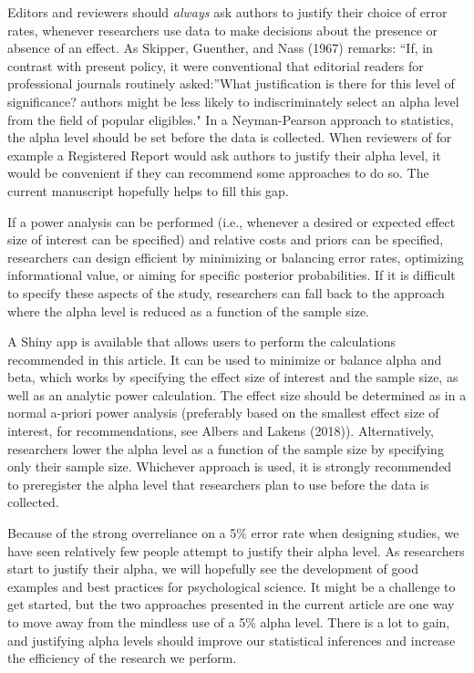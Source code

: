 \documentclass[
  english,
  ,jou, a4paper,floatsintext]{apa6}
\begin{document}
Editors and reviewers should \emph{always} ask authors to justify their choice of error rates, whenever researchers use data to make decisions about the presence or absence of an effect. As Skipper, Guenther, and Nass (1967) remarks: ``If, in contrast with present policy, it were conventional that editorial readers for professional journals routinely asked:''What justification is there for this level of significance? authors might be less likely to indiscriminately select an alpha level from the field of popular eligibles." In a Neyman-Pearson approach to statistics, the alpha level should be set before the data is collected. When reviewers of for example a Registered Report would ask authors to justify their alpha level, it would be convenient if they can recommend some approaches to do so. The current manuscript hopefully helps to fill this gap.

If a power analysis can be performed (i.e., whenever a desired or expected effect size of interest can be specified) and relative costs and priors can be specified, researchers can design efficient by minimizing or balancing error rates, optimizing informational value, or aiming for specific posterior probabilities. If it is difficult to specify these aspects of the study, researchers can fall back to the approach where the alpha level is reduced as a function of the sample size.

A Shiny app is available that allows users to perform the calculations recommended in this article. It can be used to minimize or balance alpha and beta, which works by specifying the effect size of interest and the sample size, as well as an analytic power calculation. The effect size should be determined as in a normal a-priori power analysis (preferably based on the smallest effect size of interest, for recommendations, see Albers and Lakens (2018)). Alternatively, researchers lower the alpha level as a function of the sample size by specifying only their sample size. Whichever approach is used, it is strongly recommended to preregister the alpha level that researchers plan to use before the data is collected.

Because of the strong overreliance on a 5\% error rate when designing studies, we have seen relatively few people attempt to justify their alpha level. As researchers start to justify their alpha, we will hopefully see the development of good examples and best practices for psychological science. It might be a challenge to get started, but the two approaches presented in the current article are one way to move away from the mindless use of a 5\% alpha level. There is a lot to gain, and justifying alpha levels should improve our statistical inferences and increase the efficiency of the research we perform.
\end{document}
